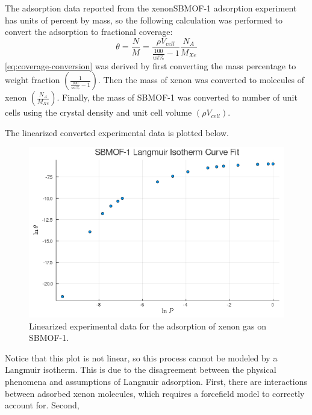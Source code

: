 \documentclass{article}
\begin{document}
The adsorption data reported from the xenon\textendash SBMOF-1 adsorption experiment has units of percent by mass, so the following calculation was performed to convert the adsorption to fractional coverage:
\begin{equation}
    \theta = \frac{N}{M} = \frac{\rho V_\textit{cell}}{\frac{100}{wt\%} - 1}\frac{N_A}{M_\textit{Xe}}
    \label{eq:coverage-conversion}
\end{equation}
\autoref{eq:coverage-conversion} was derived by first converting the mass percentage to weight fraction $\left(\frac{1}{\frac{100}{wt\%} - 1}\right)$. Then the mass of xenon was converted to molecules of xenon $\left(\frac{N_A}{M_\textit{Xe}}\right)$. Finally, the mass of SBMOF-1 was converted to number of unit cells using the crystal density and unit cell volume $\left(\rho V_\textit{cell}\right)$.

The linearized converted experimental data is plotted below.
\begin{figure}[H]
    \centering
    \includegraphics[width=\textwidth]{fig/sbmof1-langmuir.png}
    \caption{Linearized experimental data for the adsorption of xenon gas on SBMOF-1.}
    \label{fig:sbmof1-langmuir}
\end{figure}
Notice that this plot is not linear, so this process cannot be modeled by a Langmuir isotherm.
This is due to the disagreement between the physical phenomena and assumptions of Langmuir adsorption.
First, there are interactions between adsorbed xenon molecules, which requires a forcefield model to correctly account for.
Second,
\end{document}
